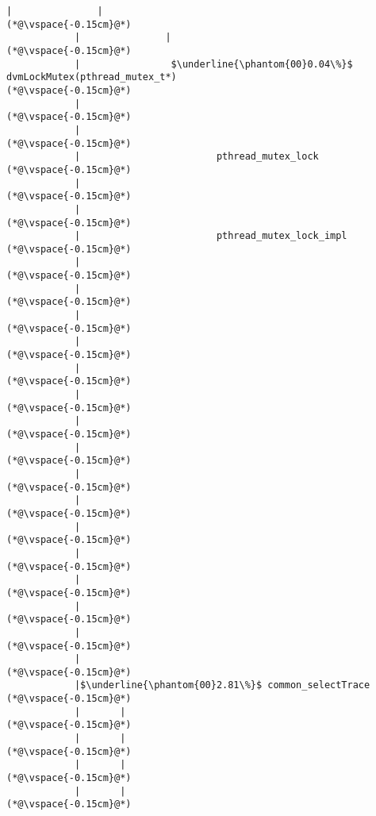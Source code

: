 \begin{lstlisting}[caption=Staattinen metodi Java$\to$C , label=profile:J2CBenchmark00001, numberbychapter=true, frame=lines, float, floatplacement=t]
            |               |
(*@\vspace{-0.15cm}@*)
            |               |
(*@\vspace{-0.15cm}@*)
            |                $\underline{\phantom{00}0.04\%}$ dvmLockMutex(pthread_mutex_t*)
(*@\vspace{-0.15cm}@*)
            |        
(*@\vspace{-0.15cm}@*)
            |        
(*@\vspace{-0.15cm}@*)
            |                        pthread_mutex_lock
(*@\vspace{-0.15cm}@*)
            |        
(*@\vspace{-0.15cm}@*)
            |        
(*@\vspace{-0.15cm}@*)
            |                        pthread_mutex_lock_impl
(*@\vspace{-0.15cm}@*)
            |        
(*@\vspace{-0.15cm}@*)
            |        
(*@\vspace{-0.15cm}@*)
            |
(*@\vspace{-0.15cm}@*)
            |
(*@\vspace{-0.15cm}@*)
            |
(*@\vspace{-0.15cm}@*)
            |
(*@\vspace{-0.15cm}@*)
            |
(*@\vspace{-0.15cm}@*)
            |
(*@\vspace{-0.15cm}@*)
            |
(*@\vspace{-0.15cm}@*)
            |
(*@\vspace{-0.15cm}@*)
            |
(*@\vspace{-0.15cm}@*)
            |
(*@\vspace{-0.15cm}@*)
            |
(*@\vspace{-0.15cm}@*)
            |
(*@\vspace{-0.15cm}@*)
            |
(*@\vspace{-0.15cm}@*)
            |
(*@\vspace{-0.15cm}@*)
            |$\underline{\phantom{00}2.81\%}$ common_selectTrace
(*@\vspace{-0.15cm}@*)
            |       |
(*@\vspace{-0.15cm}@*)
            |       |
(*@\vspace{-0.15cm}@*)
            |       |
(*@\vspace{-0.15cm}@*)
            |       |
(*@\vspace{-0.15cm}@*)

\end{lstlisting}
